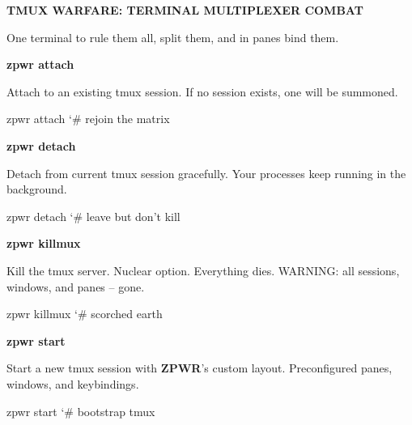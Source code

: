\documentclass[11pt,a4paper,twoside]{book}
\begin{document}
\vspace{10pt}
{\large\bfseries\color{neoncyan} TMUX WARFARE: TERMINAL MULTIPLEXER COMBAT}\vspace{6pt}

One terminal to rule them all, split them, and in panes bind them.


\vspace{12pt}
{\bfseries\color{neonyellow} zpwr attach}\vspace{4pt}

Attach to an existing tmux session. If no session exists, one will be summoned.

\begin{codebox}
\color{neongreen}zpwr attach                 {\char`\#} rejoin the matrix\\
\end{codebox}


\vspace{12pt}
{\bfseries\color{neonyellow} zpwr detach}\vspace{4pt}

Detach from current tmux session gracefully. Your processes keep running in the background.

\begin{codebox}
\color{neongreen}zpwr detach                 {\char`\#} leave but don't kill\\
\end{codebox}


\vspace{12pt}
{\bfseries\color{neonyellow} zpwr killmux}\vspace{4pt}

Kill the tmux server. Nuclear option. Everything dies. WARNING: all sessions, windows, and panes -- gone.

\begin{codebox}
\color{neongreen}zpwr killmux                {\char`\#} scorched earth\\
\end{codebox}


\vspace{12pt}
{\bfseries\color{neonyellow} zpwr start}\vspace{4pt}

Start a new tmux session with \textbf{ZPWR}'s custom layout. Preconfigured panes, windows, and keybindings.

\begin{codebox}
\color{neongreen}zpwr start                  {\char`\#} bootstrap tmux\\
\end{codebox}
\end{document}
